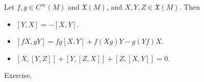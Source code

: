 \documentclass{ximera}
\begin{document}
    
    \begin{proposition}
        Let $f , g \in C^{\infty}(M)$ and $\mathfrak{X}(M)$, and $X,Y,Z \in \mathfrak{X}(M)$. Then
        \begin{itemize}
            \item $[Y,X] = - [X,Y]$.
            \item $[fX, gY] =  fg [X,Y] + f(Xg)Y - g (Yf) X. $
            \item $[X,[Y,Z]] + [Y, [Z,X] ] + [Z, [X,Y]] = 0$. 
        \end{itemize}
    
    \begin{solution}
        Exercise.
    \end{solution}
\end{proposition}
\end{document}
